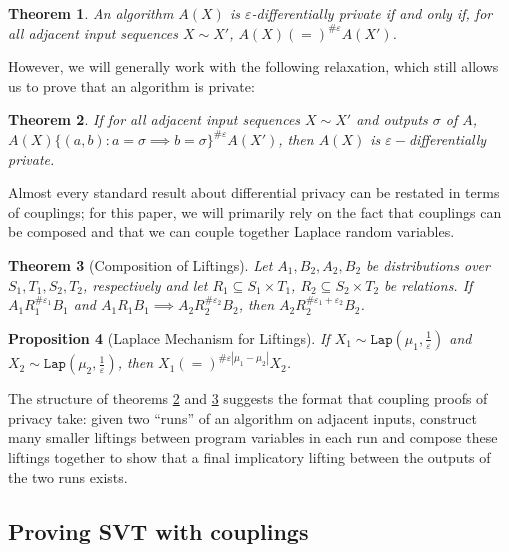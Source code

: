 \documentclass[12pt]{article}
\newcommand{\Lap}{\texttt{Lap}}
\newtheorem{thm}{Theorem}[section]
\newtheorem{prop}[thm]{Proposition}
\theoremstyle{definition}
\begin{document}
\begin{thm}
    An algorithm $A(X)$ is $\varepsilon$-differentially private if and only if, for all adjacent input sequences $X\sim X'$, $A(X)(=)^{\#\varepsilon}A(X')$.
\end{thm}

However, we will generally work with the following relaxation, which still allows us to prove that an algorithm is private:

\begin{thm}\label{implicationcouplingthm}
    If for all adjacent input sequences $X\sim X'$ and outputs $\sigma$ of $A$, $A(X)\{(a, b): a=\sigma\implies b=\sigma\}^{\#\varepsilon}A(X')$, then $A(X)$ is $\varepsilon-$differentially private.
\end{thm}

Almost every standard result about differential privacy can be restated in terms of couplings; for this paper, we will primarily rely on the fact that couplings can be composed and that we can couple together Laplace random variables. 

\begin{thm}[Composition of Liftings]\label{liftingcomposition}
    Let $A_1, B_2, A_2, B_2$ be distributions over $S_1, T_1, S_2, T_2$, respectively and let $R_1\subseteq S_1\times T_1$, $R_2\subseteq S_2\times T_2$ be relations. If $A_1 R_1^{\#\varepsilon_1}B_1$ and $A_1 R_1 B_1\implies A_2R_2^{\#\varepsilon_2}B_2$, then $A_2 R_2^{\#\varepsilon_1+\varepsilon_2}B_2$.
\end{thm}

\begin{prop}[Laplace Mechanism for Liftings]
    If $X_1\sim\Lap(\mu_1, \frac{1}{\varepsilon})$ and $X_2\sim\Lap(\mu_2, \frac{1}{\varepsilon})$, then $X_1(=)^{\#\varepsilon|\mu_1-\mu_2|}X_2$.
\end{prop}



The structure of theorems \ref{implicationcouplingthm} and \ref{liftingcomposition} suggests the format that coupling proofs of privacy take: given two ``runs'' of an algorithm on adjacent inputs, construct many smaller liftings between program variables in each run and compose these liftings together to show that a final implicatory lifting between the outputs of the two runs exists. 

\subsection{Proving SVT with couplings}
\end{document}
